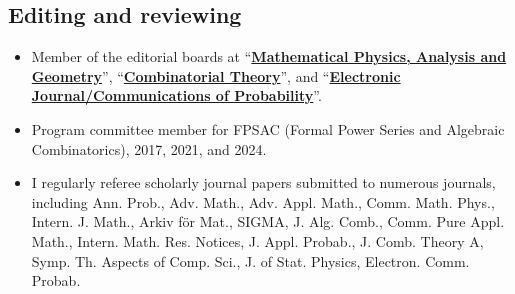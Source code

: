 \documentclass[letterpaper,11pt]{article}
\begin{document}
\subsection*{Editing and reviewing}

\begin{itemize}
	\item
	Member of the editorial boards at ``\href{https://www.springer.com/journal/11040}{\textbf{Mathematical Physics, Analysis and Geometry}}'', ``\href{https://escholarship.org/uc/combinatorial_theory/}{\textbf{Combinatorial Theory}}'', and ``\href{https://imstat.org/journals-and-publications/electronic-journal-of-probability/}{\textbf{Electronic Journal/Communications of Probability}}''.
	\item Program committee member for FPSAC (Formal Power Series and Algebraic Combinatorics),
		2017, 2021, and 2024.
	\item 
	I regularly referee scholarly journal papers submitted to numerous journals, 
	including
	Ann. Prob., Adv. Math., Adv. Appl. Math., Comm. Math. Phys., Intern. J. Math.,
	Arkiv f\"or Mat., SIGMA, J. Alg. Comb., Comm. Pure Appl. Math., Intern. Math.
	Res. Notices, J. Appl. Probab., J. Comb. Theory A, Symp. Th. Aspects of Comp.
	Sci., J. of Stat. Physics, Electron. Comm. Probab. 
\end{itemize}
\end{document}
